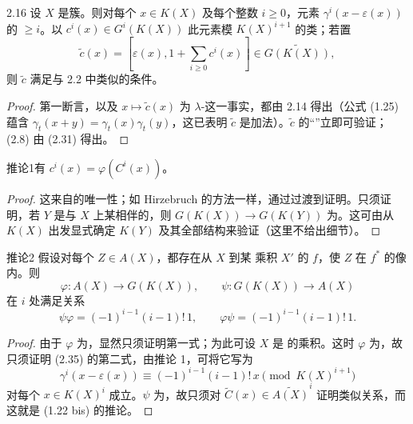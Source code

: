\begin{SGAresult}{}{2.16}
设 $X$ 是簇。则对每个 $x\in K(X)$ 及每个整数 $i\geq0$，元素 $\gamma^i(x-\varepsilon(x))$ 的 $\geq i$。以 $c^i(x)\in G^i(K(X))$ 此元素模 $K(X)^{i+1}$ 的类；若置
\[
\widetilde c(x)=\left[\varepsilon(x),1+\sum_{i\geq0}c^i(x)\right]\in\widetilde{G(K(X))},
\]
则 $\widetilde c$ 满足与 2.2 中类似的条件。
\end{SGAresult}
\begin{proof}
第一断言，以及 $x\mapsto\widetilde c(x)$ 为 $\lambda$-这一事实，都由 2.14 得出（公式 (1.25) 蕴含 $\gamma_t(x+y)=\gamma_t(x)\gamma_t(y)$，这已表明 $\widetilde c$ 是加法）。$\widetilde c$ 的“”立即可验证；
(2.8) 由 (2.31) 得出。
\end{proof}
\begin{SGAresult}{推论}{1}有 $c^i(x)=\varphi(C^i(x))$。\end{SGAresult}
\begin{proof}
这来自的唯一性；如 Hirzebruch 的方法一样，通过过渡到证明。只须证明，若 $Y$ 是与 $X$ 上某相伴的，则 $G(K(X))\to G(K(Y))$ 为。这可由从 $K(X)$ 出发显式确定 $K(Y)$ 及其全部结构来验证（这里不给出细节）。
\end{proof}
\begin{SGAresult}{推论}{2}
假设对每个 $Z\in A(X)$，都存在从 $X$ 到某 乘积 $X'$ 的 $f$，使 $Z$ 在 $f^*$ 的像内。则
\[
\varphi:A(X)\longrightarrow G(K(X)),\qquad\psi:G(K(X))\longrightarrow A(X)
\]
在 $i$ 处满足关系
\[
\psi\varphi=(-1)^{i-1}(i-1)!\,1,\qquad
\varphi\psi=(-1)^{i-1}(i-1)!\,1.\tag{2.35}
\]
\end{SGAresult}
\begin{proof}
由于 $\varphi$ 为，显然只须证明第一式；为此可设 $X$ 是 的乘积。这时 $\varphi$ 为，故只须证明 (2.35) 的第二式，由推论 1，可将它写为
\[
\gamma^i(x-\varepsilon(x))\equiv(-1)^{i-1}(i-1)!\,x\pmod {K(X)^{i+1}}
\]
对每个 $x\in K(X)^i$ 成立。$\psi$ 为，故只须对 $\widetilde C(x)\in\widetilde{A(X)}^i$ 证明类似关系，而这就是 (1.22 bis) 的推论。
\end{proof}
